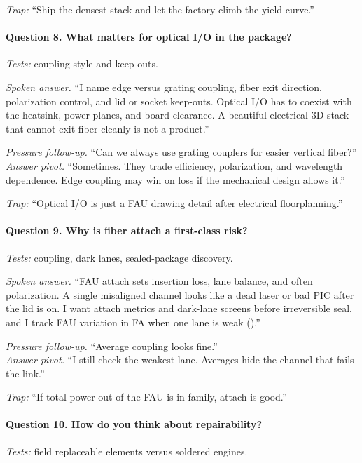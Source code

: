 \textit{Trap:} ``Ship the densest stack and let the factory climb the yield
curve.''

\paragraph{Question 8. What matters for optical I/O in the package?}
\textit{Tests:} coupling style and keep-outs.

\textit{Spoken answer.}
``I name edge versus grating coupling, fiber exit direction, polarization
control, and lid or socket keep-outs. Optical I/O has to coexist with the
heatsink, power planes, and board clearance. A beautiful electrical 3D stack
that cannot exit fiber cleanly is not a product.''

\textit{Pressure follow-up.} ``Can we always use grating couplers for easier
vertical fiber?''\\
\textit{Answer pivot.} ``Sometimes. They trade efficiency, polarization, and
wavelength dependence. Edge coupling may win on loss if the mechanical design
allows it.''

\textit{Trap:} ``Optical I/O is just a FAU drawing detail after electrical
floorplanning.''

\paragraph{Question 9. Why is fiber attach a first-class risk?}
\textit{Tests:} coupling, dark lanes, sealed-package discovery.

\textit{Spoken answer.}
``FAU attach sets insertion loss, lane balance, and often polarization. A
single misaligned channel looks like a dead laser or bad PIC after the lid is
on. I want attach metrics and dark-lane screens before irreversible seal, and
I track FAU variation in FA when one lane is weak
().''

\textit{Pressure follow-up.} ``Average coupling looks fine.''\\
\textit{Answer pivot.} ``I still check the weakest lane. Averages hide the
channel that fails the link.''

\textit{Trap:} ``If total power out of the FAU is in family, attach is good.''

\paragraph{Question 10. How do you think about repairability?}
\textit{Tests:} field replaceable elements versus soldered engines.


